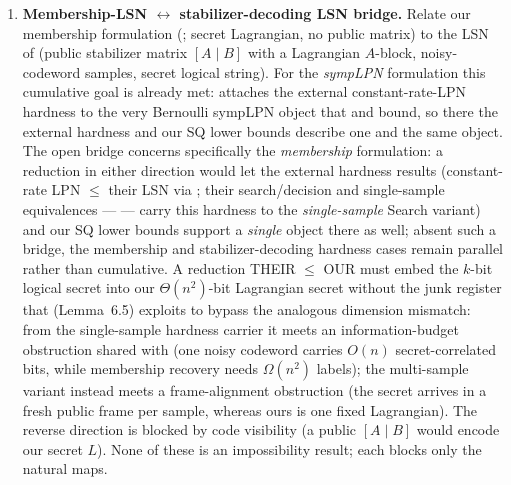 \documentclass[11pt,a4paper]{article}
\theoremstyle{plain}
\theoremstyle{definition}
\begin{document}
\begin{enumerate}
\item \textbf{Membership-LSN $\leftrightarrow$ stabilizer-decoding LSN bridge.} Relate our membership formulation (; secret Lagrangian, no public matrix) to the LSN of \cite{KLP+25,LPQR26} (public stabilizer matrix $[A \mid B]$ with a Lagrangian $A$-block, noisy-codeword samples, secret logical string). For the \emph{sympLPN} formulation this cumulative goal is already met:  attaches the external constant-rate-LPN hardness to the very Bernoulli sympLPN object that  and  bound, so there the external hardness and our SQ lower bounds describe one and the same object. The open bridge concerns specifically the \emph{membership} formulation: a reduction in either direction would let the external hardness results (constant-rate LPN $\le$ their LSN via \cite[Thm.~6.4 and Lemma~6.5]{KLP+25}; their search/decision and single-sample equivalences --- \cite[Thm.~1.9 and Cor.~5.6]{KLP+25} --- carry this hardness to the \emph{single-sample} Search variant) and our SQ lower bounds support a \emph{single} object there as well; absent such a bridge, the membership and stabilizer-decoding hardness cases remain parallel rather than cumulative. A reduction THEIR $\le$ OUR must embed the $k$-bit logical secret into our $\Theta(n^2)$-bit Lagrangian secret without the junk register that \cite{KLP+25} (Lemma~6.5) exploits to bypass the analogous dimension mismatch: from the single-sample hardness carrier it meets an information-budget obstruction shared with  (one noisy codeword carries $O(n)$ secret-correlated bits, while membership recovery needs $\Omega(n^2)$ labels); the multi-sample variant instead meets a frame-alignment obstruction (the secret arrives in a fresh public frame per sample, whereas ours is one fixed Lagrangian). The reverse direction is blocked by code visibility (a public $[A \mid B]$ would encode our secret $L$). None of these is an impossibility result; each blocks only the natural maps.


\end{enumerate}
\end{document}
